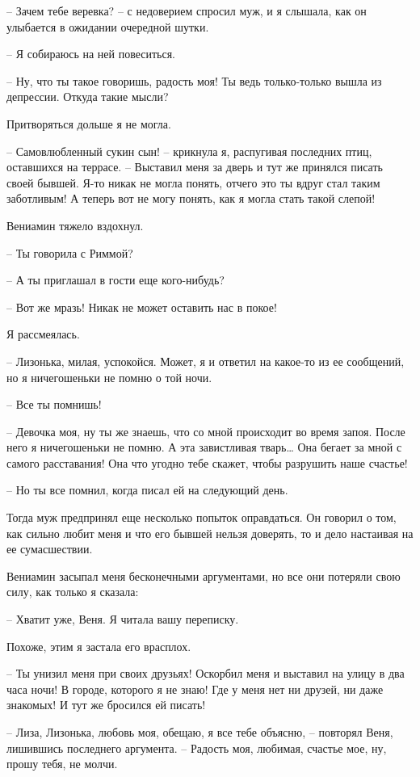 \documentclass[
]{book}
\begin{document}
-- Зачем тебе веревка? -- с недоверием спросил муж, и я слышала, как он улыбается в ожидании очередной шутки.

-- Я собираюсь на ней повеситься.

-- Ну, что ты такое говоришь, радость моя! Ты ведь только-только вышла из депрессии. Откуда такие мысли?

Притворяться дольше я не могла.

-- Самовлюбленный сукин сын! -- крикнула я, распугивая последних птиц, оставшихся на террасе. -- Выставил меня за дверь и тут же принялся писать своей бывшей. Я-то никак не могла понять, отчего это ты вдруг стал таким заботливым! А теперь вот не могу понять, как я могла стать такой слепой!

Вениамин тяжело вздохнул.

-- Ты говорила с Риммой?

-- А ты приглашал в гости еще кого-нибудь?

-- Вот же мразь! Никак не может оставить нас в покое!

Я рассмеялась.

-- Лизонька, милая, успокойся. Может, я и ответил на какое-то из ее сообщений, но я ничегошеньки не помню о той ночи.

-- Все ты помнишь!

-- Девочка моя, ну ты же знаешь, что со мной происходит во время запоя. После него я ничегошеньки не помню. А эта завистливая тварь\ldots{} Она бегает за мной с самого расставания! Она что угодно тебе скажет, чтобы разрушить наше счастье!

-- Но ты все помнил, когда писал ей на следующий день.

Тогда муж предпринял еще несколько попыток оправдаться. Он говорил о том, как сильно любит меня и что его бывшей нельзя доверять, то и дело настаивая на ее сумасшествии.

Вениамин засыпал меня бесконечными аргументами, но все они потеряли свою силу, как только я сказала:

-- Хватит уже, Веня. Я читала вашу переписку.

Похоже, этим я застала его врасплох.

-- Ты унизил меня при своих друзьях! Оскорбил меня и выставил на улицу в два часа ночи! В городе, которого я не знаю! Где у меня нет ни друзей, ни даже знакомых! И тут же бросился ей писать!

-- Лиза, Лизонька, любовь моя, обещаю, я все тебе объясню, -- повторял Веня, лишившись последнего аргумента. -- Радость моя, любимая, счастье мое, ну, прошу тебя, не молчи.
\end{document}
